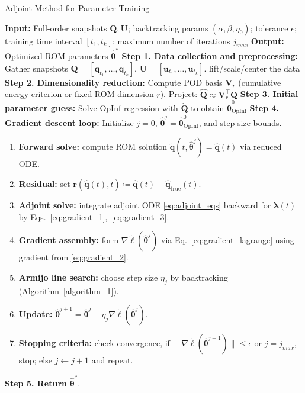 \begin{center}
\begin{minipage}{0.95\textwidth}
\begin{algorithm}[H]
\caption{Adjoint Method for Parameter Training}\label{algorithm_2}
\SetAlgoNoLine
\textbf{Input:} Full-order snapshots $\mathbf{Q},\mathbf{U}$; backtracking params $(\alpha,\beta,\eta_0)$; tolerance $\epsilon$; training time interval $[t_1, t_k]$; maximum number of iterations $j_{max}$\;
\textbf{Output:} Optimized ROM parameters $\hat{\bm\theta}^*$\;
\vspace{0.3cm}
\textbf{Step 1. Data collection and preprocessing:} Gather snapshots $\mathbf{Q}=[\mathbf{q}_{t_1},\dots,\mathbf{q}_{t_k}]$, $\mathbf{U}=[\mathbf{u}_{t_1},\dots,\mathbf{u}_{t_k}]$.
\quad [Optional] lift/scale/center the data\;
\textbf{Step 2. Dimensionality reduction:} Compute POD basis $\mathbf{V}_r$ (cumulative energy criterion or fixed ROM dimension $r$). Project: $\hat{\mathbf{Q}} \approx \mathbf{V}_r^\top\mathbf{Q}$\;
\textbf{Step 3. Initial parameter guess:} Solve OpInf regression with $\dot{\mathbf{Q}}$ to obtain $\hat{\bm\theta}^{0}_{\text{OpInf}}$\;
\textbf{Step 4. Gradient descent loop:}
Initialize $j=0$, $\hat{\bm\theta}^j=\hat{\bm\theta}^{0}_{\text{OpInf}}$, and step-size bounds.
\begin{enumerate}[label=\arabic*.]
  \item \textbf{Forward solve:}
    compute ROM solution $\tilde{\mathbf{q}}(t,\hat{\bm\theta}^j) = \hat{\mathbf{q}}(t)$ via reduced ODE.
  \item \textbf{Residual:}
    set $\mathbf{r}(\hat{\mathbf{q}}(t),t)\coloneqq\hat{\mathbf{q}}(t) - \hat{\mathbf{q}}_{\text{true}}(t)$.
  \item \textbf{Adjoint solve:}
    integrate adjoint ODE \eqref{eq:adjoint_eqs} backward for $\bm\lambda(t)$ by Eqs.~\eqref{eq:gradient_1},~\eqref{eq:gradient_3}.
  \item \textbf{Gradient assembly:}
    form $\nabla\tilde\ell(\hat{\bm\theta}^j)$ via Eq.~\eqref{eq:gradient_lagrange} using gradient from \eqref{eq:gradient_2}.
  \item \textbf{Armijo line search:}
    choose step size $\eta_j$ by backtracking (Algorithm~\ref{algorithm_1}).
  \item \textbf{Update:}
    $\hat{\bm\theta}^{j+1}=\hat{\bm\theta}^j-\eta_j\nabla\tilde\ell(\hat{\bm\theta}^j)$.
  \item \textbf{Stopping criteria:}
    check convergence, if $\|\nabla\tilde\ell(\hat{\bm\theta}^{j+1})\|\le\epsilon$ or $j=j_{max}$, stop; else $j\leftarrow j+1$ and repeat.
\end{enumerate}
\textbf{Step 5. Return} {$\hat{\bm\theta}^*$}.
\end{algorithm}
\end{minipage}
\end{center}
    

